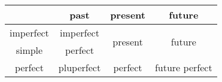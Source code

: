 \begin{tabular}{@{}cccc@{}}
    \toprule
              & past       & present                  & future                  \\ \midrule
    imperfect & \acl{imperfect}  & \multirow{2}{*}{\acl{present}} & \multirow{2}{*}{\acl{future}} \\
    simple    & \acl{perfect}    &                          &                         \\
    perfect   & \acl{pluperfect} & \acl{perfect}                  & \acl{future perfect}          \\ \bottomrule
\end{tabular}